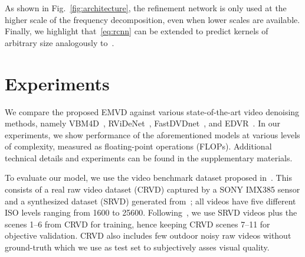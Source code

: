 \documentclass[final]{cvpr}
\begin{document}
    As shown in Fig.~\ref{fig:architecture}, the refinement network is only used at the higher scale of the frequency decomposition, even when lower scales are available. Finally, we highlight that~\eqref{eq:rcnn} can be extended to predict kernels of arbitrary size analogously to~\cite{mildenhall2018kpn}.
    
    
    \section{Experiments}
    \label{section:experiments}

    We compare the proposed EMVD against various state-of-the-art video denoising methods, namely VBM4D~\cite{maggioni2012vbm4d},  RViDeNet~\cite{yue2020supervised}, FastDVDnet~\cite{tassano2020fastdvdnet}, and EDVR~\cite{wang2019edvr}. In our experiments, we show performance of the aforementioned models at various levels of complexity, measured as floating-point operations (FLOPs). Additional technical details and experiments can be found in the supplementary materials.  
    
    To evaluate our model, we use the video benchmark dataset proposed in~\cite{yue2020supervised}. This consists of a real raw video dataset (CRVD) captured by a SONY IMX385 sensor and a synthesized dataset (SRVD) generated from~\cite{chen2018sid}; all videos have five different ISO levels ranging from 1600 to 25600. Following~\cite{yue2020supervised}, we use SRVD videos plus the scenes 1--6 from CRVD for training, hence keeping CRVD scenes 7--11 for objective validation. CRVD also includes few outdoor noisy raw videos without ground-truth which we use as test set to subjectively asses visual quality. 
\end{document}
